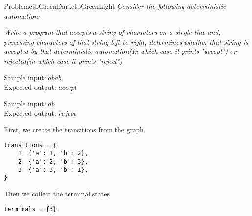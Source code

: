 \documentclass[12pt]{simple_doc}
\begin{document}

    \begin{cbstripe}{Problem}{ctbGreenDark}{ctbGreenLight}
        \textit{Consider the following deterministic automation:}

        \begin{center}
        \end{center}

        \textit{Write a program that accepts a string of characters on a single line and,
            processing characters of that string left to right, determines whether that
            string is accepted by that deterministic automation(In which case it prints
            "accept") or rejected(in which case it prints "reject") } \medskip

        Sample input: $abab$\\
        Expected output: $accept$

        Sample input: $ab$\\
        Expected output: $reject$

    \end{cbstripe}

    \renewcommand{\theFancyVerbLine}{\sffamily \textcolor[rgb]{1.0,0.8,0.0}{\large \oldstylenums{\arabic{FancyVerbLine}}}}


    First, we create the transitions from the graph
    \begin{verbatim}
transitions = {
    1: {'a': 1, 'b': 2},
    2: {'a': 2, 'b': 3},
    3: {'a': 3, 'b': 1},
}
    \end{verbatim}

    Then we collect the terminal states
    \begin{verbatim}
terminals = {3}
    \end{verbatim}
\end{document}
